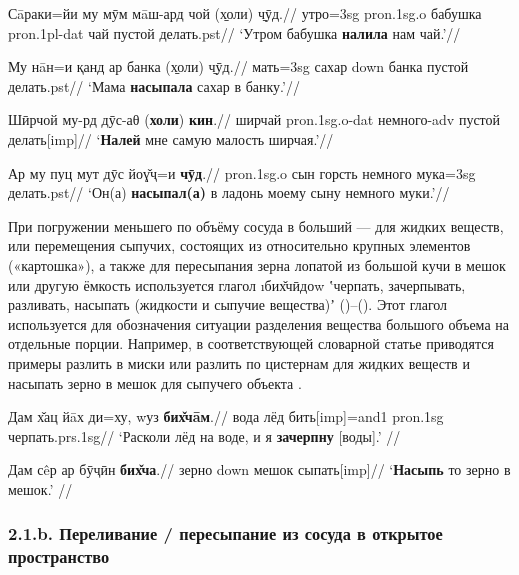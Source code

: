 \begingl
\gla Сāраки=йи му мӯм мāш-ард чой (\b{холи}) \b{чӯд}.//
\glc утро={\sc 3sg} {\sc pron.1sg.o} бабушка {\sc pron.1pl-dat} чай пустой делать.{\sc pst}//
\glft ‘Утром бабушка \textbf{налила} нам чай.’//
\endgl \xe

\begingl
\gla Му нāн=и қанд ар банка (\b{холи}) \b{чӯд}.//
 мать={\sc 3sg} сахар {\sc down} банка пустой делать.{\sc pst}//
\glft ‘Мама \textbf{насыпала} сахар в банку.’//
\endgl \xe

\begingl
\gla Шӣрчой му-рд дӯс-аθ (\textbf{холи}) \textbf{кин}.//
\glc ширчай {\sc pron.1sg.o-dat} немного-{\sc adv} пустой делать[{\sc imp}]//
\glft ‘\textbf{Налей} мне самую малость ширчая.’//
\endgl \xe

\begingl
\gla Ар му пуц мут дӯс йоɣ̌ҷ=и \textbf{чӯд}.//
 {\sc pron.1sg.o} сын горсть немного мука={\sc 3sg} делать.{\sc pst}//
\glft ‘Он(а) \textbf{насыпал(а)} в ладонь моему сыну немного муки.’//
\endgl \xe

При погружении меньшего по объёму сосуда в больший — для жидких веществ, или перемещения сыпучих, состоящих из относительно крупных элементов («картошка»), а также для пересыпания зерна лопатой из большой кучи в мешок или другую ёмкость используется глагол \i{бих̌чӣдоw} ʽчерпать, зачерпывать, разливать, насыпать (жидкости и сыпучие вещества)ʼ ()–(). Этот глагол используется для обозначения ситуации разделения вещества большого объема на отдельные порции. Например, в соответствующей словарной статье приводятся примеры разлить в миски или разлить по цистернам для жидких веществ и насыпать зерно в мешок для сыпучего объекта \parencite[257–258]{karamshoev1988}.

\begingl
\gla Дам х̌ац йāх ди=ху, wуз \textbf{бих̌чāм}.//
 вода лёд бить[{\sc imp}]={\sc and1} {\sc pron.1sg} черпать.{\sc prs.1sg}//
\glft ‘Расколи лёд на воде, и я \textbf{зачерпну} [воды].’ //
\endgl \xe

\begingl
\gla Дам сêр ар бӯҷӣн \textbf{бих̌ча}.//
 зерно {\sc down} мешок сыпать[{\sc imp}]//
\glft ‘\textbf{Насыпь} то зерно в мешок.’ //
\endgl \xe

\subsubsection{2.1.b. Переливание / пересыпание из сосуда в открытое пространство} \label{pour-21b}

